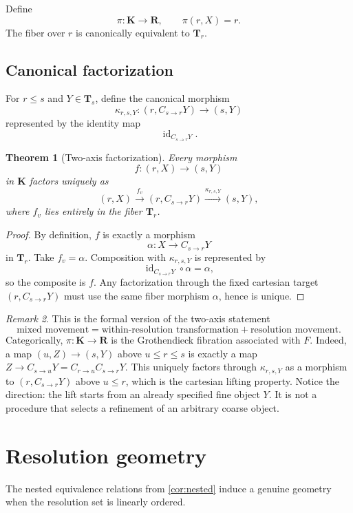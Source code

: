 \documentclass[11pt]{article}
\newtheorem{theorem}{Theorem}[section]
\theoremstyle{definition}
\theoremstyle{remark}
\newtheorem{remark}[theorem]{Remark}
\newcommand{\K}{\mathbf K}
\newcommand{\Rcat}{\mathbf R}
\newcommand{\Tcat}{\mathbf T}
\newcommand{\id}{\operatorname{id}}
\begin{document}
Define
\[
\pi:\K\to\Rcat,
\qquad
\pi(r,X)=r.
\]
The fiber over $r$ is canonically equivalent to $\Tcat_r$.

\subsection{Canonical factorization}

For $r\le s$ and $Y\in\Tcat_s$, define the canonical morphism
\[
\kappa_{r,s,Y}:
(r,C_{s\to r}Y)\longrightarrow(s,Y)
\]
represented by the identity map
\[
\id_{C_{s\to r}Y}.
\]

\begin{theorem}[Two-axis factorization]\label{thm:factorization}
Every morphism
\[
f:(r,X)\longrightarrow(s,Y)
\]
in $\K$ factors uniquely as
\[
(r,X)
\xrightarrow{f_v}
(r,C_{s\to r}Y)
\xrightarrow{\kappa_{r,s,Y}}
(s,Y),
\]
where $f_v$ lies entirely in the fiber $\Tcat_r$.
\end{theorem}

\begin{proof}
By definition, $f$ is exactly a morphism
\[
\alpha:X\to C_{s\to r}Y
\]
in $\Tcat_r$. Take $f_v=\alpha$. Composition with $\kappa_{r,s,Y}$ is represented by
\[
\id_{C_{s\to r}Y}\circ\alpha=\alpha,
\]
so the composite is $f$. Any factorization through the fixed cartesian target $(r,C_{s\to r}Y)$ must use the same fiber morphism $\alpha$, hence is unique.
\end{proof}

\begin{remark}
This is the formal version of the two-axis statement
\[
\boxed{
\text{mixed movement}
=
\text{within-resolution transformation}
+
\text{resolution movement}.
}
\]
Categorically, $\pi:\K\to\Rcat$ is the Grothendieck fibration associated with $F$. Indeed, a map $(u,Z)\to(s,Y)$ above $u\le r\le s$ is exactly a map $Z\to C_{s\to u}Y=C_{r\to u}C_{s\to r}Y$. This uniquely factors through $\kappa_{r,s,Y}$ as a morphism to $(r,C_{s\to r}Y)$ above $u\le r$, which is the cartesian lifting property. Notice the direction: the lift starts from an already specified fine object $Y$. It is not a procedure that selects a refinement of an arbitrary coarse object.
\end{remark}

\section{Resolution geometry}

The nested equivalence relations from \cref{cor:nested} induce a genuine geometry when the resolution set is linearly ordered.
\end{document}
